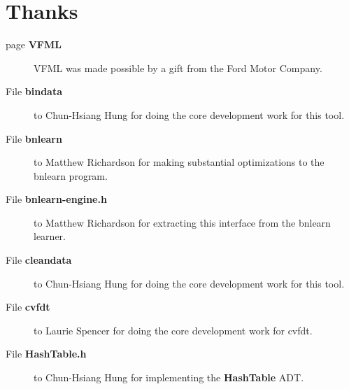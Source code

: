 \section{Thanks}\label{thanks}
\label{_thanks000001}
 \begin{description}
\item[page {\bf VFML} ]VFML was made possible by a gift from the Ford Motor Company. \end{description}


\label{_thanks000006}
 \begin{description}
\item[File {\bf bindata} ]to Chun-Hsiang Hung for doing the core development work for this tool. \end{description}


\label{_thanks000004}
 \begin{description}
\item[File {\bf bnlearn} ]to Matthew Richardson for making substantial optimizations to the bnlearn program. \end{description}


\label{_thanks000003}
 \begin{description}
\item[File {\bf bnlearn-engine.h} ]to Matthew Richardson for extracting this interface from the bnlearn learner. \end{description}


\label{_thanks000007}
 \begin{description}
\item[File {\bf cleandata} ]to Chun-Hsiang Hung for doing the core development work for this tool. \end{description}


\label{_thanks000005}
 \begin{description}
\item[File {\bf cvfdt} ]to Laurie Spencer for doing the core development work for cvfdt. \end{description}


\label{_thanks000002}
 \begin{description}
\item[File {\bf Hash\-Table.h} ]to Chun-Hsiang Hung for implementing the {\bf Hash\-Table} ADT. \end{description}
